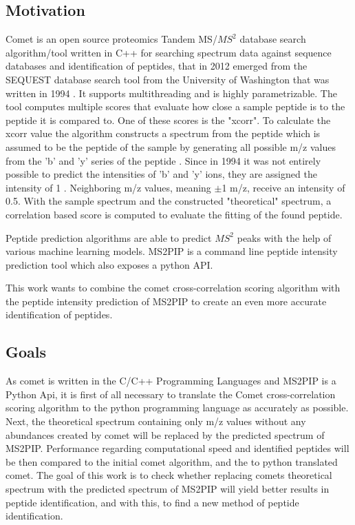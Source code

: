 \documentclass[11pt]{article}
\begin{document}
\subsection{Motivation}
Comet is an open source proteomics Tandem MS/\(MS^2\) database search algorithm/tool written in C++ for searching spectrum data against sequence databases and identification of peptides, that in 2012 emerged from the SEQUEST database search tool from the University of Washington that was written in 1994 \cite{comet-search-tool}. It supports multithreading and is highly parametrizable. The tool computes multiple scores that evaluate how close a sample peptide is to the peptide it is compared to. One of these scores is the "xcorr". To calculate the xcorr value the algorithm constructs a spectrum from the peptide which is assumed to be the peptide of the sample by generating all possible m/z values from the 'b' and 'y' series of the peptide \cite{comet-first-paper}. Since in 1994 it was not entirely possible to predict the intensities of 'b' and 'y' ions, they are assigned the intensity of 1 \cite{deeper-look-into-comet}. Neighboring m/z values, meaning $\pm$1 m/z, receive an intensity of 0.5. With the sample spectrum and the constructed "theoretical" spectrum, a correlation based score is computed
to evaluate the fitting of the found peptide.

Peptide prediction algorithms are able to predict \(MS^2\) peaks with the help of various machine learning models.
MS2PIP\cite{ms2pip} is a command line peptide intensity prediction tool which also exposes a python API.

This work wants to combine the comet cross-correlation scoring algorithm
with the peptide intensity prediction of MS2PIP to create an even more accurate identification of peptides.


\subsection{Goals}
As comet is written in the C/C++ Programming Languages and MS2PIP is a Python Api, it is first of all necessary to translate the Comet cross-correlation scoring algorithm to the python programming language as accurately as possible. Next, the theoretical spectrum containing only m/z values without any abundances created by comet will be replaced by the predicted spectrum of MS2PIP. Performance regarding computational speed and identified peptides will be then compared to the initial comet algorithm, and the to python translated comet.
The goal of this work is to check whether replacing comets theoretical spectrum with the predicted spectrum of MS2PIP will yield better results in peptide identification, and with this, to find a new method of peptide identification.
\end{document}
